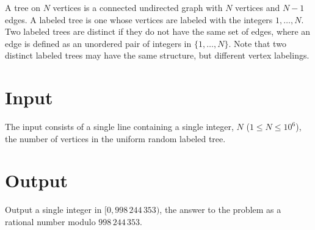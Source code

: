 A tree on $N$ vertices is a connected undirected graph with $N$ vertices and
$N - 1$ edges. A labeled tree is one whose vertices are labeled with the
integers $1, \dots, N$. Two labeled trees are distinct if they do not have the
same set of edges, where an edge is defined as an unordered pair of integers in
$\{1, \dots, N\}$. Note that two distinct labeled trees may have the same
structure, but different vertex labelings.

\section*{Input}

The input consists of a single line containing a single integer, $N$
($1 \leq N \leq 10^6$), the number of vertices in the uniform random labeled
tree.

\section*{Output}

Output a single integer in $[0, 998\,244\,353)$, the answer to the problem
as a rational number modulo $998\,244\,353$.

